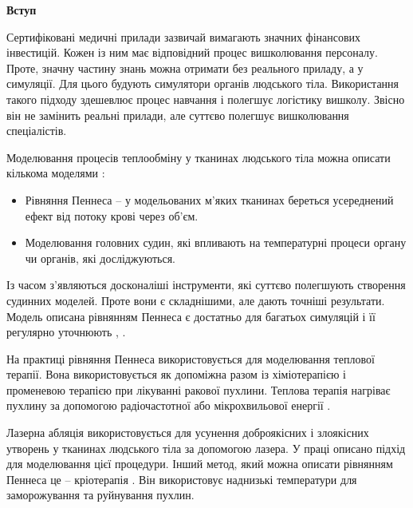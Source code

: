 
\begin{center}
  \textbf{Вступ}
\end{center}

Сертифіковані медичні прилади зазвичай вимагають значних фінансових інвестицій. Кожен із ним має відповідний процес
вишколювання персоналу. Проте, значну частину знань можна отримати без реального приладу, а у симуляції. Для цього
будують симулятори органів людського тіла. Використання такого підходу здешевлює процес навчання і полегшує логістику
вишколу. Звісно він не замінить реальні прилади, але суттєво полегшує вишколювання спеціалістів.

Моделювання процесів теплообміну у тканинах людського тіла можна описати кількома моделями
\cite{kutz-zhu-heat-transfer-biological-systems}:
\begin{itemize}
  \item Рівняння Пеннеса \cite{thermal-process-tissue-pennes} -- у модельованих м'яких тканинах береться усереднений
        ефект від потоку крові через об'єм.
  \item Моделювання головних судин, які впливають на температурні процеси органу чи органів, які досліджуються.
\end{itemize}
Із часом з'являються досконаліші інструменти, які суттєво полегшують створення судинних моделей. Проте вони є
складнішими, але дають точніші результати. Модель описана рівнянням Пеннеса є достатньо для багатьох симуляцій і її 
регулярно уточнюють \cite{thermal-process-tissue-pennes-explained}, \cite{elsapaa2023thermoelastic}.

На практиці рівняння Пеннеса використовується для моделювання теплової терапії. Вона використовується як допоміжна разом
із хіміотерапією і променевою терапією при лікуванні ракової пухлини. Теплова терапія нагріває пухлину за допомогою 
радіочастотної або мікрохвильової енергії \cite{elsapaa2023thermoelastic}. 

Лазерна абляція використовується для усунення доброякісних і злоякісних утворень у тканинах людського тіла за допомогою
лазера. У праці \cite{munshid2025laser} описано підхід для моделювання цієї процедури. Інший метод, який можна описати
рівнянням Пеннеса це -- кріотерапія \cite{fahmy2025fractional}. Він використовує наднизькі температури для заморожування
та руйнування пухлин.

